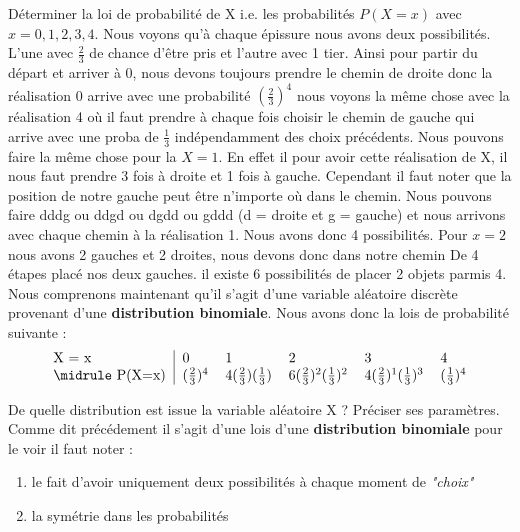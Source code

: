 \begin{exo}
  \begin{subexo}{Déterminer la loi de probabilité de X i.e. les probabilités
      $P(X = x)$ avec $x = 0, 1, 2, 3, 4$.}
    Nous voyons qu'à chaque épissure nous avons deux possibilités.
    L'une avec $\frac{2}{3}$ de chance d'être pris et l'autre avec 1 tier.
    Ainsi pour partir du départ et arriver à 0,
    nous devons toujours prendre le chemin de droite donc la réalisation 0 arrive avec une
    probabilité $(\frac{2}{3})^4 $ nous voyons la même chose avec la réalisation 4 où il faut prendre
    à chaque fois choisir le chemin de gauche qui arrive avec une proba de $\frac{1}{3}$ indépendamment
    des choix précédents.
    Nous pouvons faire la même chose pour la $X = 1$. En effet il pour avoir cette réalisation de X,
    il nous faut prendre 3 fois à droite et 1 fois à gauche. Cependant il faut noter
    que la position de notre gauche peut être n'importe où dans le chemin.
    Nous pouvons faire dddg ou ddgd ou dgdd ou gddd (d = droite et g = gauche)
    et nous arrivons avec chaque chemin à la réalisation 1. Nous avons donc
    4 possibilités. Pour $x = 2$ nous avons 2 gauches et 2 droites, nous devons donc dans notre chemin De
    4 étapes placé nos deux gauches. il existe 6 possibilités de placer 2 objets parmis 4.
    Nous comprenons maintenant qu'il s'agit d'une variable aléatoire discrète provenant d'une
    \textbf{distribution binomiale}. Nous avons donc la lois de probabilité suivante :
    \[\begin{tabular}{@{}l|lllll@{}}
        X = x  & 0                                 & 1
               & 2                                 & 3
               & 4                                                                     \\ \midrule
        P(X=x) & $(\frac{2}{3})^4$                 & $4(\frac{2}{3})(\frac{1}{3})$
               & $6(\frac{2}{3})^2(\frac{1}{3})^2$ & $4(\frac{2}{3})^1(\frac{1}{3})^3$
               & $(\frac{1}{3})^4$
      \end{tabular}
    \]
  \end{subexo}
  \begin{subexo}{De quelle distribution est issue la variable aléatoire X ? 
    Préciser ses paramètres.}
  Comme dit précédement il s'agit d'une lois d'une\textbf{ distribution binomiale}
  pour le voir il faut noter :
  \begin{enumerate}[]
    \item le fait d'avoir uniquement deux possibilités à chaque moment de \textit{"choix"}
    \item la symétrie dans les probabilités 
  \end{enumerate}
  \end{subexo}
\end{exo}
